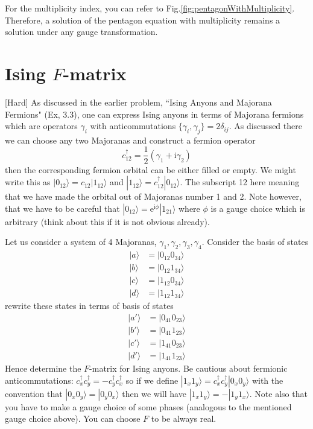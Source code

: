 \documentclass{book}
\begin{document}
For the multiplicity index, you can refer to Fig.\ref{fig:pentagonWithMultiplicity}. Therefore, a solution of the pentagon equation with multiplicity remains a solution under any gauge transformation.

\section{Ising $F$-matrix}
[Hard] As discussed in the earlier problem, ``Ising Anyons and Majorana Fermions" (Ex, 3.3), one can express Ising anyons in terms of Majorana fermions which are operators $\gamma _{i}$ with anticommutations $\{\gamma _{i} ,\gamma _{j}\} =2\delta _{ij}$. As discussed there we can choose any two Majoranas and construct a fermion operator
\begin{equation*}
c_{12}^{\dagger } =\frac{1}{2}( \gamma _{1} +\mathrm{i} \gamma _{2})
\end{equation*}
then the corresponding fermion orbital can be either filled or empty. We might write this as $| 0_{12} \rangle =c_{12}| 1_{12} \rangle $ and $| 1_{12} \rangle =c_{12}^{\dagger }| 0_{12} \rangle $. The subscript 12 here meaning that we have made the orbital out of Majoranas number 1 and 2. Note however, that we have to be careful that $| 0_{12} \rangle =\mathrm{e}^{\mathrm{i} \phi }| 1_{21} \rangle $ where $\phi $ is a gauge choice which is arbitrary (think about this if it is not obvious already).

Let us consider a system of 4 Majoranas, $\gamma _{1} ,\gamma _{2} ,\gamma _{3} ,\gamma _{4}$. Consider the basis of states
\begin{equation*}
\begin{aligned}
|a\rangle  & =| 0_{12} 0_{34} \rangle \\
|b\rangle  & =| 0_{12} 1_{34} \rangle \\
|c\rangle  & =| 1_{12} 0_{34} \rangle \\
|d\rangle  & =| 1_{12} 1_{34} \rangle 
\end{aligned}
\end{equation*}
rewrite these states in terms of basis of states
\begin{equation*}
\begin{aligned}
| a'\rangle  & =| 0_{41} 0_{23} \rangle \\
| b'\rangle  & =| 0_{41} 1_{23} \rangle \\
| c'\rangle  & =| 1_{41} 0_{23} \rangle \\
| d'\rangle  & =| 1_{41} 1_{23} \rangle 
\end{aligned}
\end{equation*}
Hence determine the $F$-matrix for Ising anyons. Be cautious about fermionic anticommutations: $c_{x}^{\dagger } c_{y}^{\dagger } =-c_{y}^{\dagger } c_{x}^{\dagger }$ so if we define $| 1_{x} 1_{y} \rangle =c_{x}^{\dagger } c_{y}^{\dagger }| 0_{x} 0_{y} \rangle $ with the convention that $| 0_{x} 0_{y} \rangle =| 0_{y} 0_{x} \rangle $ then we will have $| 1_{x} 1_{y} \rangle =-| 1_{y} 1_{x} \rangle $. Note also that you have to make a gauge choice of some phases (analogous to the mentioned gauge choice above). You can choose $F$ to be always real.
\end{document}
